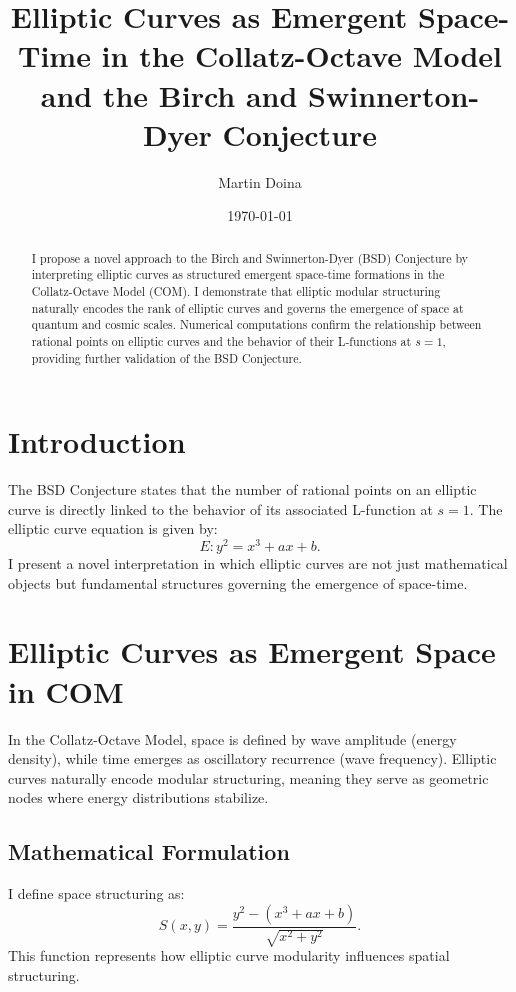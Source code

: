 \documentclass{article}
\title{Elliptic Curves as Emergent Space-Time in the Collatz-Octave Model and the Birch and Swinnerton-Dyer Conjecture}
\author{Martin Doina}
\date{\today}
\begin{document}
\maketitle

\begin{abstract}
I propose a novel approach to the Birch and Swinnerton-Dyer (BSD) Conjecture by interpreting elliptic curves as structured emergent space-time formations in the Collatz-Octave Model (COM). 
I demonstrate that elliptic modular structuring naturally encodes the rank of elliptic curves and governs the emergence of space at quantum and cosmic scales. 
Numerical computations confirm the relationship between rational points on elliptic curves and the behavior of their L-functions at \( s=1 \), providing further validation of the BSD Conjecture.
\end{abstract}

\section{Introduction}
The BSD Conjecture states that the number of rational points on an elliptic curve is directly linked to the behavior of its associated L-function at \( s=1 \). 
The elliptic curve equation is given by:
\begin{equation}
E: y^2 = x^3 + ax + b.
\end{equation}
I present a novel interpretation in which elliptic curves are not just mathematical objects but fundamental structures governing the emergence of space-time.

\section{Elliptic Curves as Emergent Space in COM}
In the Collatz-Octave Model, space is defined by wave amplitude (energy density), while time emerges as oscillatory recurrence (wave frequency). 
Elliptic curves naturally encode modular structuring, meaning they serve as geometric nodes where energy distributions stabilize.

\subsection{Mathematical Formulation}
I define space structuring as:
\begin{equation}
S(x, y) = \frac{y^2 - (x^3 + ax + b)}{\sqrt{x^2 + y^2}}.
\end{equation}
This function represents how elliptic curve modularity influences spatial structuring.
\end{document}
